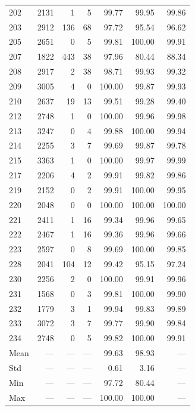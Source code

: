 \documentclass[11pt]{article}
\begin{document}
\begin{table}[p]
\begin{tabular}{lrrrrrr}
202 & 2131 & 1 & 5 & 99.77 & 99.95 & 99.86 \\
203 & 2912 & 136 & 68 & 97.72 & 95.54 & 96.62 \\
205 & 2651 & 0 & 5 & 99.81 & 100.00 & 99.91 \\
207 & 1822 & 443 & 38 & 97.96 & 80.44 & 88.34 \\
208 & 2917 & 2 & 38 & 98.71 & 99.93 & 99.32 \\
209 & 3005 & 4 & 0 & 100.00 & 99.87 & 99.93 \\
210 & 2637 & 19 & 13 & 99.51 & 99.28 & 99.40 \\
212 & 2748 & 1 & 0 & 100.00 & 99.96 & 99.98 \\
213 & 3247 & 0 & 4 & 99.88 & 100.00 & 99.94 \\
214 & 2255 & 3 & 7 & 99.69 & 99.87 & 99.78 \\
215 & 3363 & 1 & 0 & 100.00 & 99.97 & 99.99 \\
217 & 2206 & 4 & 2 & 99.91 & 99.82 & 99.86 \\
219 & 2152 & 0 & 2 & 99.91 & 100.00 & 99.95 \\
220 & 2048 & 0 & 0 & 100.00 & 100.00 & 100.00 \\
221 & 2411 & 1 & 16 & 99.34 & 99.96 & 99.65 \\
222 & 2467 & 1 & 16 & 99.36 & 99.96 & 99.66 \\
223 & 2597 & 0 & 8 & 99.69 & 100.00 & 99.85 \\
228 & 2041 & 104 & 12 & 99.42 & 95.15 & 97.24 \\
230 & 2256 & 2 & 0 & 100.00 & 99.91 & 99.96 \\
231 & 1568 & 0 & 3 & 99.81 & 100.00 & 99.90 \\
232 & 1779 & 3 & 1 & 99.94 & 99.83 & 99.89 \\
233 & 3072 & 3 & 7 & 99.77 & 99.90 & 99.84 \\
234 & 2748 & 0 & 5 & 99.82 & 100.00 & 99.91 \\
\midrule
Mean & --- & --- & --- & 99.63 & 98.93 & --- \\
Std  & --- & --- & --- & 0.61  & 3.16  & --- \\
Min  & --- & --- & --- & 97.72 & 80.44 & --- \\
Max  & --- & --- & --- & 100.00 & 100.00 & --- \\
\bottomrule
\end{tabular}
\end{table}
\end{document}
